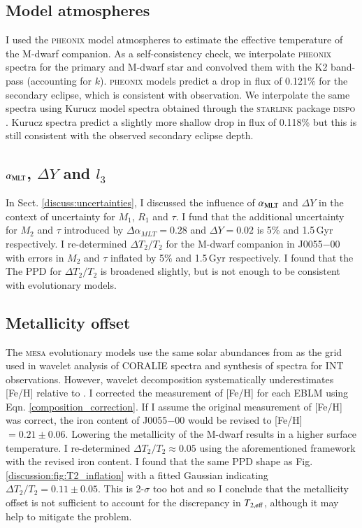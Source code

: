 \subsection{Model atmospheres}

I used the \textsc{pheonix} model atmospheres to estimate the effective temperature of the M-dwarf companion. As a self-consistency check, we interpolate \textsc{pheonix} spectra for the primary and M-dwarf star and convolved them with the K2 band-pass (accounting for $k$). \textsc{pheonix} models predict a drop in flux of 0.121\% for the secondary eclipse, which is consistent with observation. We interpolate the same spectra using Kurucz model spectra obtained through the \textsc{starlink} package \textsc{dispo} \citep{2014ascl.soft05016H}. Kurucz spectra predict a slightly more shallow drop in flux of 0.118\% but this is still consistent with the observed secondary eclipse depth.

\subsection{$\alpha_{\rm MLT}$, $\Delta Y$ and $l_3$}

In Sect. \ref{discuss:uncertainties}, I discussed the influence of $\alpha_{\rm MLT}$ and $\Delta Y$ in the context of uncertainty for $M_1$, $R_1$ and $\tau$. I fund that the additional uncertainty for $M_2$ and $\tau$  introduced by  $\Delta \alpha_{MLT} = 0.28$ and $\Delta Y = 0.02$ is 5\% and 1.5\,Gyr respectively. I re-determined  $\Delta T_2 / T_2$ for the M-dwarf companion in J0055$-$00 with errors in $M_2$ and $\tau$ inflated by 5\% and 1.5\,Gyr respectively. I found that the The PPD for $\Delta T_2 / T_2$ is broadened slightly, but is not enough to be consistent with evolutionary models.

\subsection{Metallicity offset}

The \textsc{mesa} evolutionary models use the same solar abundances from \citet{2009ARA&A..47..481A} as the grid used in wavelet analysis of CORALIE spectra and synthesis of spectra for INT observations. However, wavelet decomposition systematically underestimates [Fe/H] relative to \citet{Doyle2015}. I corrected the measurement of [Fe/H] for each EBLM using Eqn. \ref{composition_correction}. If I assume the original measurement of [Fe/H] was correct, the iron content of J0055$-$00 would be revised to [Fe/H]$=0.21 \pm 0.06$. Lowering the metallicity of the M-dwarf results in a higher surface temperature. I re-determined $\Delta T_2 / T_2 \approx 0.05$ using the aforementioned framework with the revised iron content. I found that the same PPD shape as Fig. \ref{discussion:fig:T2_inflation} with a fitted Gaussian indicating $\Delta T_2 / T_2 = 0.11 \pm 0.05$. This is 2-$\sigma$ too hot and so I conclude that the metallicity offset is not sufficient to account for the discrepancy in $T_{\rm 2,eff}$, although it may help to mitigate the problem.

